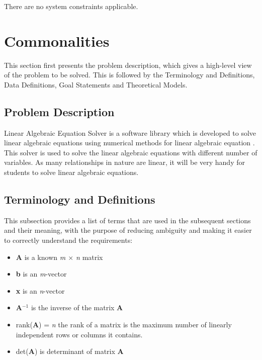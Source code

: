 \documentclass[12pt]{article}
\newcommand{\progname}{Linear Algebraic Equation Solver} %
\begin{document}
There are no system constraints applicable.

\section{Commonalities}

This section first presents the problem description, which gives a high-level
view of the problem to be solved. This is followed by the Terminology and
Definitions, Data Definitions, Goal Statements and Theoretical Models.

\subsection{Problem Description} \label{Sec_pd}

\progname{} is a software library which is developed to solve linear algebraic equations using numerical methods for linear algebraic equation . This solver is used to solve the linear algebraic equations with different number of variables. As many relationships in nature are linear, it will be very handy for
students to solve linear algebraic equations.

\subsection{Terminology and  Definitions}

This subsection provides a list of terms that are used in the subsequent
sections and their meaning, with the purpose of reducing ambiguity and making it
easier to correctly understand the requirements:




\begin{itemize}

\item \textbf{A} is a known \textit{m $\times$ n} matrix 

\item \textbf{b} is an \textit{m}-vector 

\item \textbf{x} is an \textit{n}-vector

\item \textbf{A$^{-1}$} is the inverse of the matrix \textbf{A}

\item rank(\textbf{A}) = \textit{n} the rank of a matrix is the maximum number
of linearly independent rows or columns it contains. 

\item det(\textbf{A}) is determinant of matrix \textbf{A}


\end{itemize}
\end{document}
